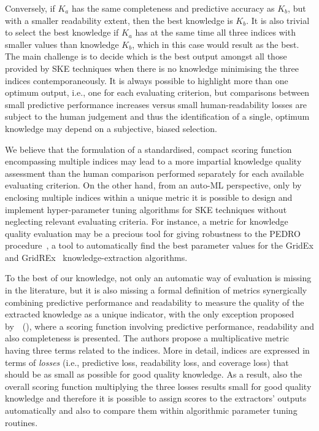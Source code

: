 \documentclass{article}
\newcommand{\citet}[1]{\citeauthor{#1}~(\citeyear{#1})}
\newcommand{\gridex}{GridEx}
\newcommand{\gridrex}{GridREx}
\newcommand{\pedro}{\textsc{PEDRO}}
\begin{document}
%
Conversely, if $K_a$ has the same completeness and predictive accuracy as $K_b$, but with a smaller readability extent, then the best knowledge is $K_b$.
%
It is also trivial to select the best knowledge if $K_a$ has at the same time all three indices with smaller values than knowledge $K_b$, which in this case would result as the best.
%
The main challenge is to decide which is the best output amongst all those provided by SKE techniques when there is no knowledge minimising the three indices contemporaneously.
%
It is always possible to highlight more than one optimum output, i.e., one for each evaluating criterion, but comparisons between small predictive performance increases versus small human-readability losses are subject to the human judgement and thus the identification of a single, optimum knowledge may depend on a subjective, biased selection.

We believe that the formulation of a standardised, compact scoring function encompassing multiple indices may lead to a more impartial knowledge quality assessment than the human comparison performed separately for each available evaluating criterion.
%
On the other hand, from an auto-ML perspective, only by enclosing multiple indices within a unique metric it is possible to design and implement hyper-parameter tuning algorithms for SKE techniques without neglecting relevant evaluating criteria.
%
For instance, a metric for knowledge quality evaluation may be a precious tool for giving robustness to the \pedro{} procedure~\cite{gridrex-kr2022}, a tool to automatically find the best parameter values for the \gridex{} and \gridrex{}~\cite{gridex-extraamas2021,gridrex-kr2022} knowledge-extraction algorithms.

To the best of our knowledge, not only an automatic way of evaluation is missing in the literature, but it is also missing a formal definition of metrics synergically combining predictive performance and readability to measure the quality of the extracted knowledge as a unique indicator, with the only exception proposed by~\citet{skemetrics-aaai2023}, where a scoring function involving predictive performance, readability and also completeness is presented.
%
The authors propose a multiplicative metric having three terms related to the indices.
%
More in detail, indices are expressed in terms of \emph{losses} (i.e., predictive loss, readability loss, and coverage loss) that should be as small as possible for good quality knowledge.
%
As a result, also the overall scoring function multiplying the three losses results small for good quality knowledge and therefore it is possible to assign scores to the extractors' outputs automatically and also to compare them within algorithmic parameter tuning routines.
\end{document}
